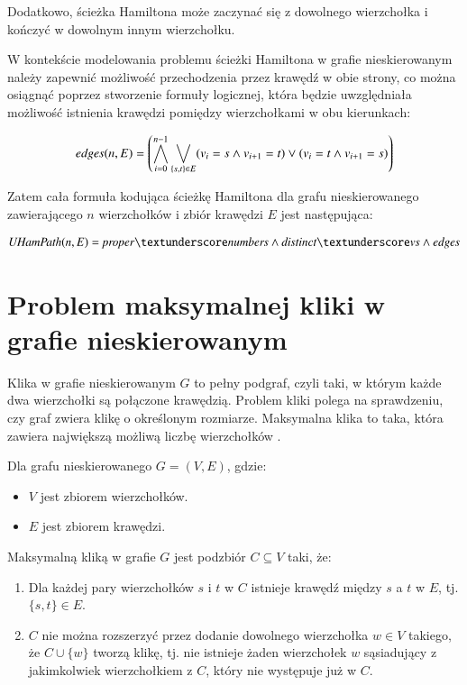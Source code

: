 Dodatkowo, ścieżka Hamiltona może zaczynać się z dowolnego wierzchołka i kończyć w dowolnym innym wierzchołku.

W kontekście modelowania problemu ścieżki Hamiltona w grafie nieskierowanym należy zapewnić możliwość przechodzenia przez krawędź w obie strony, co można osiągnąć poprzez stworzenie formuły logicznej, która będzie uwzględniała możliwość istnienia krawędzi pomiędzy wierzchołkami w obu kierunkach:

\begin{align*}
	{\mathit{edges}}(n, E) = \left( \bigwedge_{i=0}^{n-1} \bigvee_{\{s,t\} \in E} (v_i = s \land v_{i+1} = t) \lor (v_i = t \land v_{i+1} = s) \right)
\end{align*}


Zatem cała formuła kodująca ścieżkę Hamiltona dla grafu nieskierowanego zawierającego \(n\) wierzchołków i zbiór krawędzi \(E\) jest następująca:

\begin{align*}
	\UHamPath(n, E) = \propernumbers \land \distinctvs \land \edges
\end{align*}


\section{Problem maksymalnej kliki w grafie nieskierowanym}

Klika w grafie nieskierowanym \(G\) to pełny podgraf, czyli taki, w którym każde dwa wierzchołki są połączone krawędzią. Problem kliki polega na sprawdzeniu, czy graf zwiera klikę o określonym rozmiarze. Maksymalna klika to taka, która zawiera największą możliwą liczbę wierzchołków \cite{Sipser0086373}. 

Dla grafu nieskierowanego $G = (V, E)$, gdzie:
\begin{itemize}
 	\item \(V\) jest zbiorem wierzchołków.
 	\item \(E\) jest zbiorem krawędzi.
\end{itemize}
Maksymalną kliką w grafie \(G\) jest podzbiór $C \subseteq V$ taki, że:
\begin{enumerate}
 	\item Dla każdej pary wierzchołków \(s\) i \(t\) w \(C\) istnieje krawędź między \(s\) a \(t\) w \(E\), tj. $\{s, t\}\in E$. 
 	\item \(C\) nie można rozszerzyć przez dodanie dowolnego wierzchołka $w\in V$ takiego, że $C \cup \{w\}$ tworzą klikę, tj. nie istnieje żaden wierzchołek \(w\) sąsiadujący z jakimkolwiek wierzchołkiem z \(C\), który nie występuje już w \(C\).
\end{enumerate}

